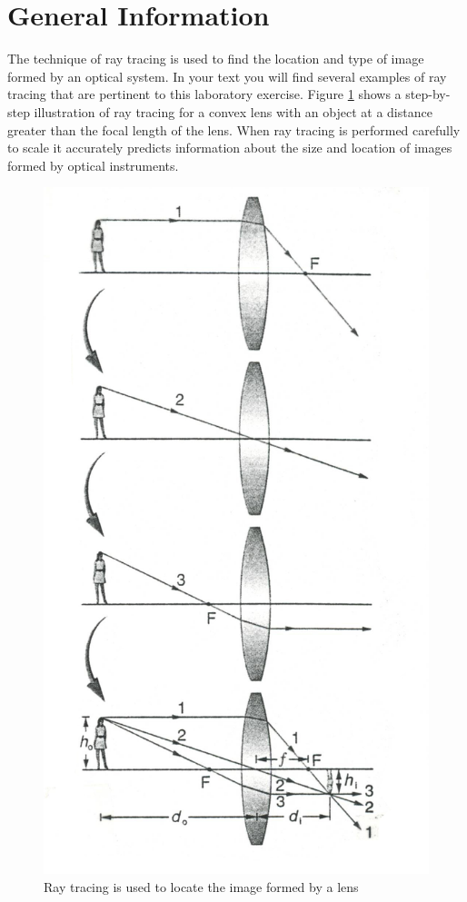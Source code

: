 \section{General Information}


The technique of ray tracing is used to find the location and type of image formed by an optical system. In your text you will find several examples of ray tracing that are pertinent to this laboratory exercise. Figure \ref{f:fig17} shows a step-by-step illustration of ray tracing for a convex lens with an object at a distance greater than the focal length of the lens.  When ray tracing is performed carefully to scale it accurately predicts information about the size and location of images formed by optical instruments.

\begin{figure}
	\centering
	\includegraphics[scale=0.7]{5bgraf/fig_17}
	\caption{Ray tracing is used to locate the image formed by a lens}
	\label{f:fig17}
\end{figure}

